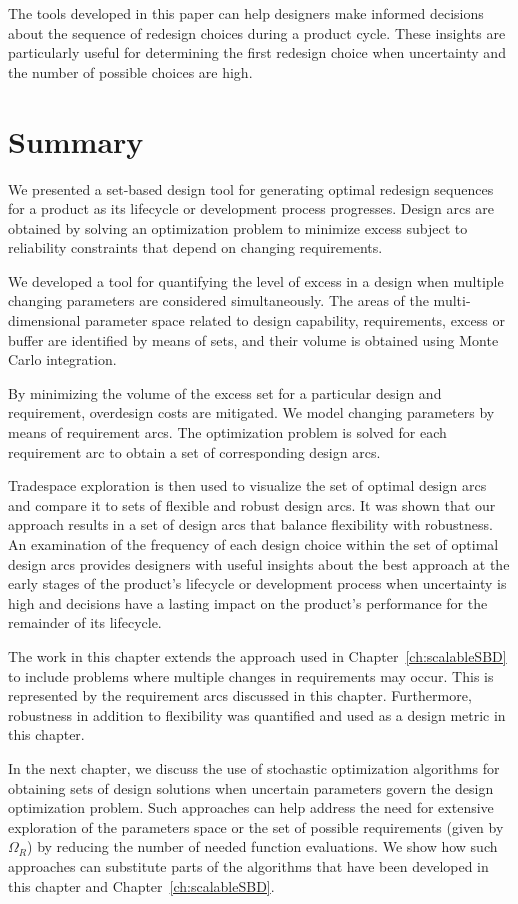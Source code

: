 The tools developed in this paper can help designers make informed decisions about the sequence of redesign choices during a product cycle. These insights are particularly useful for determining the first redesign choice when uncertainty  and the number of possible choices are high.

\section{Summary}
\label{sec:TSEcontsummary}

We presented a set-based design tool for generating optimal redesign sequences for a product as its lifecycle or development process progresses. Design arcs are obtained by solving an optimization problem to minimize excess subject to reliability constraints that depend on changing requirements.

We developed a tool for quantifying the level of excess in a design when multiple changing parameters are considered simultaneously. The areas of the multi-dimensional parameter space related to design capability, requirements, excess or buffer are identified by means of sets, and their volume is obtained using Monte Carlo integration.

By minimizing the volume of the excess set for a particular design and requirement, overdesign costs are mitigated. We model changing parameters by means of requirement arcs. The optimization problem is solved for each requirement arc to obtain a set of corresponding design arcs.

Tradespace exploration is then used to visualize the set of optimal design arcs and compare it to sets of flexible and robust design arcs. It was shown that our approach results in a set of design arcs that balance flexibility with robustness. An examination of the frequency of each design choice within the set of optimal design arcs provides designers with useful insights about the best approach at the early stages of the product's lifecycle or development process when uncertainty is high and decisions have a lasting impact on the product's performance for the remainder of its lifecycle.

The work in this chapter extends the approach used in Chapter~\ref{ch:scalableSBD} to include problems where multiple changes in requirements may occur. This is represented by the requirement arcs discussed in this chapter. Furthermore, robustness in addition to flexibility was quantified and used as a design metric in this chapter.

In the next chapter, we discuss the use of stochastic optimization algorithms for obtaining sets of design solutions when uncertain parameters govern the design optimization problem. Such approaches can help address the need for extensive exploration of the parameters space or the set of possible requirements (given by $\Omega_R$) by reducing the number of needed function evaluations. We show how such approaches can substitute parts of the algorithms that have been developed in this chapter and Chapter~\ref{ch:scalableSBD}.